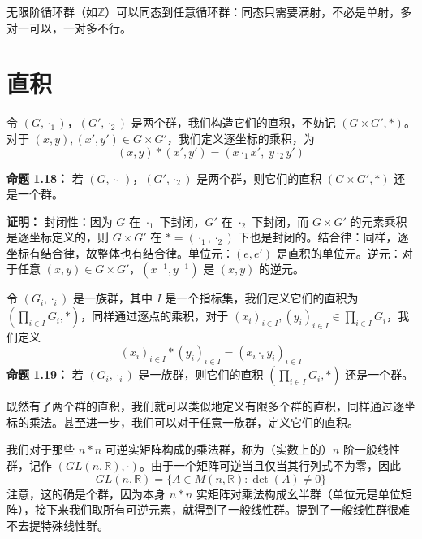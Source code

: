 \begin{note}[无限阶的群和任意循环群同态]
无限阶循环群（如$\mathbb{Z}$）可以同态到任意循环群：同态只需要满射，不必是单射，多对一可以，一对多不行。
\end{note}

\section{直积}

\begin{definition}[两个群直积（定义 1.18）]
令 $(G,\cdot_1)$，$(G',\cdot_2)$ 是两个群，我们构造它们的直积，不妨记 $(G\times G',*)$。对于 $(x,y),(x',y')\in G\times G'$，我们定义逐坐标的乘积，为
\[
(x,y)*(x',y')=(x\cdot_1 x',\;y\cdot_2 y')
\]

\textbf{命题 1.18：} 若 $(G,\cdot_1)$，$(G',\cdot_2)$ 是两个群，则它们的直积 $(G\times G',*)$ 还是一个群。

\textbf{证明：} 封闭性：因为 $G$ 在 $\cdot_1$ 下封闭，$G'$ 在 $\cdot_2$ 下封闭，而 $G\times G'$ 的元素乘积是逐坐标定义的，则 $G\times G'$ 在 $*=(\cdot_1,\cdot_2)$ 下也是封闭的。结合律：同样，逐坐标有结合律，故整体也有结合律。单位元：$(e,e')$ 是直积的单位元。逆元：对于任意 $(x,y)\in G\times G'$，$(x^{-1},y^{-1})$ 是 $(x,y)$ 的逆元。
\end{definition}

\begin{definition}[一族群的直积（定义 1.19）]
令 $(G_i,\cdot_i)$ 是一族群，其中 $I$ 是一个指标集，我们定义它们的直积为 $(\prod_{i\in I}G_i,*)$，同样通过逐点的乘积，对于 $(x_i)_{i\in I},(y_i)_{i\in I}\in\prod_{i\in I}G_i$，我们定义
\[
(x_i)_{i\in I}*(y_i)_{i\in I}=(x_i\cdot_i y_i)_{i\in I}
\]
\textbf{命题 1.19：} 若 $(G_i,\cdot_i)$ 是一族群，则它们的直积 $(\prod_{i\in I}G_i,*)$ 还是一个群。

既然有了两个群的直积，我们就可以类似地定义有限多个群的直积，同样通过逐坐标的乘法。甚至进一步，我们可以对于任意一族群，定义它们的直积。
\end{definition}

\begin{definition}[$n$ 阶一般线性群（定义 1.11）]
我们对于那些 $n*n$ 可逆实矩阵构成的乘法群，称为（实数上的）$n$ 阶一般线性群，记作 $(GL(n,\mathbb{R}),\cdot)$。由于一个矩阵可逆当且仅当其行列式不为零，因此
\[
GL(n,\mathbb{R})=\{A\in M(n,\mathbb{R}):\det(A)\ne 0\}
\]
注意，这的确是个群，因为本身 $n*n$ 实矩阵对乘法构成幺半群（单位元是单位矩阵），接下来我们取所有可逆元素，就得到了一般线性群。提到了一般线性群很难不去提特殊线性群。
\end{definition}


